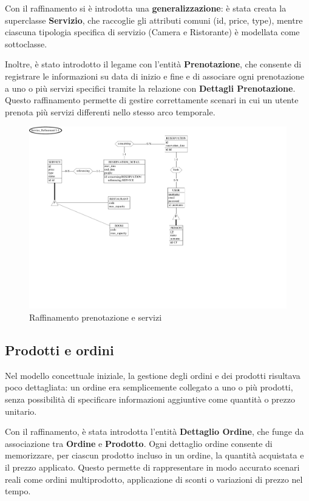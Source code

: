 \documentclass[a4paper,12pt]{report}
\begin{document}
\vspace{\baselineskip}
Con il raffinamento si è introdotta una \textbf{generalizzazione}: è
stata creata la superclasse
\textbf{Servizio}, che raccoglie gli attributi comuni (id, price,
type), mentre ciascuna
tipologia specifica di servizio (Camera e Ristorante) è modellata
come sottoclasse.

\vspace{\baselineskip}
Inoltre, è stato introdotto il legame con l'entità
\textbf{Prenotazione}, che consente di
registrare le informazioni su data di inizio e fine e di associare
ogni prenotazione a uno o
più servizi specifici tramite la relazione con \textbf{Dettagli
Prenotazione}. Questo
raffinamento permette di gestire correttamente scenari in cui un
utente prenota più servizi
differenti nello stesso arco temporale.
\begin{figure}[H]
  \centering
  \includegraphics[width=\textwidth, trim=0 200pt 300pt 0,
  clip]{./schemas/refinements/service.pdf}
  \caption{Raffinamento prenotazione e servizi}
  \label{fig:raffinamento-servizi-prenotazione}
\end{figure}

\newpage
\subsection{Prodotti e ordini}
Nel modello concettuale iniziale, la gestione degli ordini e dei
prodotti risultava poco
dettagliata: un ordine era semplicemente collegato a uno o più
prodotti, senza possibilità di
specificare informazioni aggiuntive come quantità o prezzo unitario.

\vspace{\baselineskip}
Con il raffinamento, è stata introdotta l'entità \textbf{Dettaglio
Ordine}, che funge da
associazione tra \textbf{Ordine} e \textbf{Prodotto}. Ogni dettaglio
ordine consente di
memorizzare, per ciascun prodotto incluso in un ordine, la quantità
acquistata e il prezzo
applicato. Questo permette di rappresentare in modo accurato scenari
reali come ordini
multiprodotto, applicazione di sconti o variazioni di prezzo nel tempo.
\end{document}
